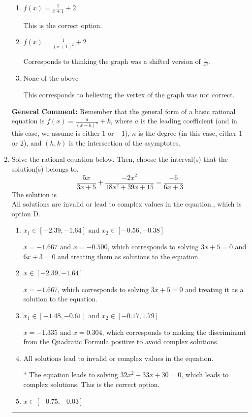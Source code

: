 \documentclass{extbook}[14pt]
\newcommand{\litem}[1]{\item #1

\rule{\textwidth}{0.4pt}}
\begin{document}
\begin{enumerate}
{\begin{enumerate}[label=\Alph*.]
Corresponds to using the general form $f(x) = \frac{a}{x+h}+k$ and the opposite leading coefficient.
\item \( f(x) = \frac{1}{x + 1} + 2 \)

This is the correct option.
\item \( f(x) = \frac{1}{(x + 1)^2} + 2 \)

Corresponds to thinking the graph was a shifted version of $\frac{1}{x^2}$.
\item \( \text{None of the above} \)

This corresponds to believing the vertex of the graph was not correct.
\end{enumerate}

\textbf{General Comment:} Remember that the general form of a basic rational equation is $ f(x) = \frac{a}{(x-h)^n} + k$, where $a$ is the leading coefficient (and in this case, we assume is either $1$ or $-1$), $n$ is the degree (in this case, either $1$ or $2$), and $(h, k)$ is the intersection of the asymptotes.
}
\litem{
Solve the rational equation below. Then, choose the interval(s) that the solution(s) belongs to.
\[ \frac{5x}{3x + 5} + \frac{-2x^{2}}{18x^{2} +39 x + 15} = \frac{-6}{6x + 3} \]The solution is \( \text{All solutions are invalid or lead to complex values in the equation.} \), which is option D.\begin{enumerate}[label=\Alph*.]
\item \( x_1 \in [-2.39, -1.64] \text{ and } x_2 \in [-0.56,-0.38] \)

$x = -1.667 \text{ and } x = -0.500$, which corresponds to solving $3x + 5 = 0$ and $6x + 3 = 0$ and treating them as solutions to the equation.
\item \( x \in [-2.39,-1.64] \)

$x = -1.667$, which corresponds to solving $3x + 5 = 0$ and treating it as a solution to the equation.
\item \( x_1 \in [-1.48, -0.61] \text{ and } x_2 \in [-0.17,1.79] \)

$x = -1.335 \text{ and } x = 0.304$, which corresponds to making the discriminant from the Quadratic Formula positive to avoid complex solutions.
\item \( \text{All solutions lead to invalid or complex values in the equation.} \)

* The equation leads to solving $32x^{2} +33 x + 30=0$, which leads to complex solutions. This is the correct option.
\item \( x \in [-0.75,-0.03] \)


\end{enumerate}}
\end{enumerate}
\end{document}
